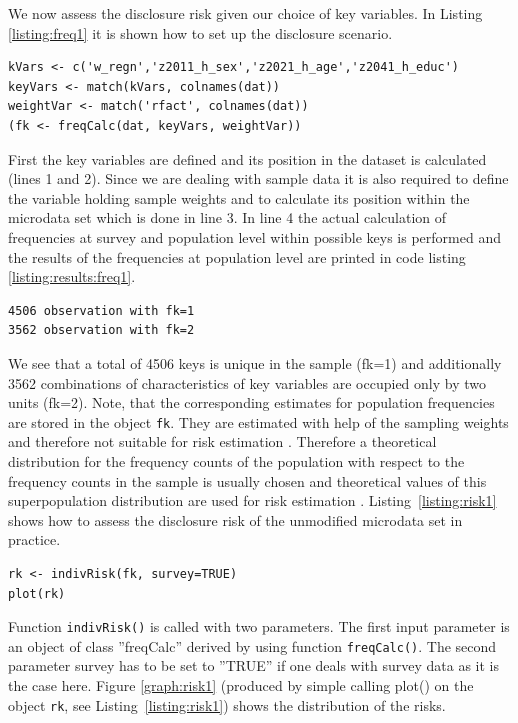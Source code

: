\documentclass[12pt]{article}
\begin{document}
We now assess the disclosure risk given our choice of key variables. In Listing \ref{listing:freq1} it is shown how to set up the disclosure scenario. 
\begin{lstlisting}[captionpos=b, caption={Performing frequency calculations}, label=listing:freq1]
kVars <- c('w_regn','z2011_h_sex','z2021_h_age','z2041_h_educ')
keyVars <- match(kVars, colnames(dat))
weightVar <- match('rfact', colnames(dat))
(fk <- freqCalc(dat, keyVars, weightVar))
\end{lstlisting}
First the key variables are defined and its position in the dataset is 
calculated (lines 1 and 2). Since we are dealing with sample data it is also required 
to define the variable holding sample weights and to calculate its position within 
the microdata set which is done in line 3. In line 4 the actual calculation of 
frequencies at survey and population level within possible keys is performed and the results of the frequencies at
population level are printed in code listing \ref{listing:results:freq1}.

\begin{lstlisting}[numbers=none,captionpos=b, caption={Results of first frequency calculation}, label=listing:results:freq1]
4506 observation with fk=1 
3562 observation with fk=2 
\end{lstlisting}

We see that a total of 4506 keys is unique in the sample (fk=1) and additionally 3562 combinations of 
characteristics of key variables are occupied only by two units (fk=2). 
Note, that the corresponding estimates for population frequencies are stored in the object \texttt{fk}. 
They are estimated with help of the sampling weights and therefore not suitable for risk estimation \citep[for details have a look at][]{templ09diss}.
Therefore a theoretical distribution for the frequency counts of the population with respect to the frequency counts 
in the sample is usually chosen and theoretical values of this superpopulation distribution are used for 
risk estimation \citep[for details, see][]{Rinott06}.
Listing~\ref{listing:risk1} shows how 
to assess the disclosure risk of the unmodified microdata set in practice.

\begin{lstlisting}[captionpos=b, caption={Assessing disclosure risk of unmodified microdata}, label=listing:risk1]
rk <- indivRisk(fk, survey=TRUE)
plot(rk)
\end{lstlisting}
Function \lstinline{indivRisk()} is called with two parameters. 
The first input parameter is an object of class ''freqCalc'' derived by using 
function \lstinline{freqCalc()}. The second parameter survey has to be set to ''TRUE'' if one deals 
with survey data as it is the case here. Figure \ref{graph:risk1} (produced by simple calling plot() on the object \texttt{rk}, see 
Listing~\ref{listing:risk1}) shows the distribution of the risks. 
\end{document}
